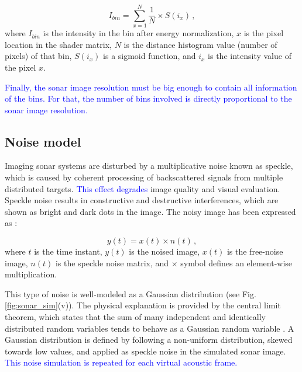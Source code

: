\documentclass[final,5p,times]{elsarticle}
\begin{document}
\begin{equation}
    \label{eq:1}
    I_{bin} = \sum\limits_{x=1}^N \frac{1}{N} \times S(i_{x}) \, ,
\end{equation}
where $I_{bin}$ is the intensity in the bin after energy normalization,
$x$ is the pixel location in the shader matrix, $N$ is the distance histogram
value (number of pixels) of that bin, $S(i_{x})$ is a sigmoid function,
and $i_{x}$ is the intensity value of the pixel $x$.

\textcolor{blue}{Finally, the sonar image resolution must be big enough to contain all
information of the bins. For that, the number of bins involved is directly
proportional to the sonar image resolution.}


\subsection{Noise model}
\label{dev:noise}

Imaging sonar systems are disturbed by a multiplicative noise known as speckle,
which is caused by coherent processing of backscattered signals from multiple
distributed targets. \textcolor{blue}{This effect degrades} image quality and visual
evaluation. Speckle noise results in constructive and destructive interferences,
which are shown as bright and dark dots in the image. The noisy image has been
expressed as \cite{lee1980}:

\begin{equation}
\label{eq:2}
y(t) = x(t) \times n(t) \, ,
\end{equation}
where $t$ is the time instant, $y(t)$ is the noised image, $x(t)$ is the
free-noise image, $n(t)$ is the speckle noise matrix, and $\times$ symbol defines an
element-wise multiplication.

This type of noise is well-modeled as a Gaussian distribution (see Fig. \ref{fig:sonar_sim}(v)). The physical explanation is provided by the central limit theorem, which states that the
sum of many independent and identically distributed random variables tends
to behave as a Gaussian random variable \textcolor{blue}{\cite{papoulis2002}}. A Gaussian distribution is defined by following a non-uniform distribution, skewed towards low values, and applied as speckle noise in the simulated sonar image. \textcolor{blue}{This noise simulation is repeated for each virtual acoustic frame.}
\end{document}
